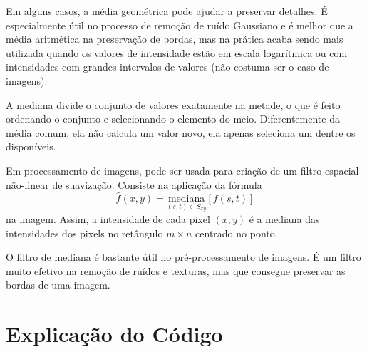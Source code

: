 \documentclass[12pt,a4paper]{article}
\begin{document}
Em alguns casos, a média geométrica pode ajudar a preservar detalhes. É especialmente útil no processo de remoção de ruído Gaussiano e é melhor que a média aritmética na preservação de bordas, mas na prática acaba sendo mais utilizada quando os valores de intensidade estão em escala logarítmica ou com intensidades com grandes intervalos de valores (não costuma ser o caso de imagens).

A mediana divide o conjunto de valores exatamente na metade, o que é feito ordenando o conjunto e selecionando o elemento do meio. Diferentemente da média comum, ela não calcula um valor novo, ela apenas seleciona um dentre os disponíveis.

Em processamento de imagens, pode ser usada para criação de um filtro espacial não-linear de suavização. Consiste na aplicação da fórmula $$ \hat{f}(x,y) = \underset{(s,t)\in S_{xy}}{\mathrm{mediana}} [f(s,t)] $$ na imagem. Assim, a intensidade de cada pixel $(x, y)$ é a mediana das intensidades dos pixels no retângulo $m \times n$ centrado no ponto.

O filtro de mediana é bastante útil no pré-processamento de imagens. É um filtro muito efetivo na remoção de ruídos e texturas, mas que consegue preservar as bordas de uma imagem.

\section{Explicação do Código}

\nocite{comin2020}
\nocite{ponti2011}
\nocite{wiki01}
\nocite{wiki02}







\end{document}
